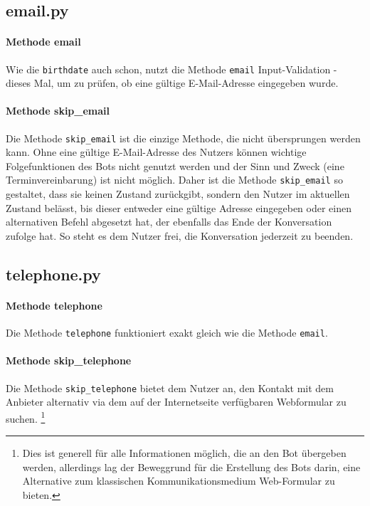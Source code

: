         
        \subsection{email.py} \label{email.py}
            \paragraph{Methode email}
                Wie die \verb|birthdate| auch schon, nutzt die Methode \verb|email| Input-Validation - dieses Mal, um zu prüfen, ob eine gültige E-Mail-Adresse eingegeben wurde. 

            \paragraph{Methode skip\_email}
                Die Methode \verb|skip_email| ist die einzige Methode, die nicht übersprungen werden kann. Ohne eine gültige E-Mail-Adresse des Nutzers können wichtige Folgefunktionen des Bots nicht genutzt werden und der Sinn und Zweck (eine Terminvereinbarung) ist nicht möglich. Daher ist die Methode \verb|skip_email| so gestaltet, dass sie keinen Zustand zurückgibt, sondern den Nutzer im aktuellen Zustand belässt, bis dieser entweder eine gültige Adresse eingegeben oder einen alternativen Befehl abgesetzt hat, der ebenfalls das Ende der Konversation zufolge hat. So steht es dem Nutzer frei, die Konversation jederzeit zu beenden. 
        
            
        \subsection{telephone.py} \label{telephone.py}
            \paragraph{Methode telephone}
                Die Methode \verb|telephone| funktioniert exakt gleich wie die Methode \verb|email|.

            \paragraph{Methode skip\_telephone}
                Die Methode \verb|skip_telephone| bietet dem Nutzer an, den Kontakt mit dem Anbieter alternativ via dem auf der Internetseite verfügbaren Webformular zu suchen. \footnote{Dies ist generell für alle Informationen möglich, die an den Bot übergeben werden, allerdings lag der Beweggrund für die Erstellung des Bots darin, eine Alternative zum klassischen Kommunikationsmedium Web-Formular zu bieten.}
        
